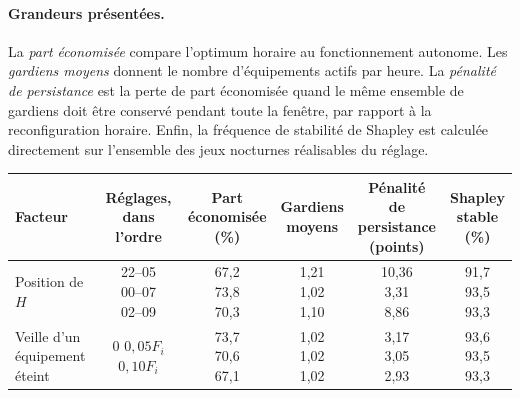 \paragraph{Grandeurs présentées.}
La \emph{part économisée} compare l'optimum horaire au fonctionnement
autonome. Les \emph{gardiens moyens} donnent le nombre d'équipements actifs
par heure. La \emph{pénalité de persistance} est la perte de part économisée
quand le même ensemble de gardiens doit être conservé pendant toute la
fenêtre, par rapport à la reconfiguration horaire. Enfin, la fréquence de
stabilité de Shapley est calculée directement sur l'ensemble des jeux
nocturnes réalisables du réglage.

\begin{table}[htbp]
\centering
\small
\setlength{\tabcolsep}{3pt}
\begin{tabular}{lccccc}
\hline
Facteur & Réglages, dans l'ordre &
\shortstack{Part\\économisée\\(\%)} &
\shortstack{Gardiens\\moyens} &
\shortstack{Pénalité de\\persistance\\(points)} &
\shortstack{Shapley\\stable\\(\%)} \\
\hline
Position de \(H\) &
\shortstack{22--05\\00--07\\02--09} &
\shortstack{67,2\\73,8\\70,3} &
\shortstack{1,21\\1,02\\1,10} &
\shortstack{10,36\\3,31\\8,86} &
\shortstack{91,7\\93,5\\93,3} \\[2pt]
\shortstack[l]{Veille d'un équipement\\éteint} &
\shortstack{\(0\)\\\(0{,}05F_i\)\\\(0{,}10F_i\)} &
\shortstack{73,7\\70,6\\67,1} &
\shortstack{1,02\\1,02\\1,02} &
\shortstack{3,17\\3,05\\2,93} &
\shortstack{93,6\\93,5\\93,3} \\[2pt]

\end{tabular}
\end{table}
